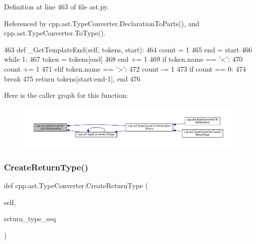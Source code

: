 Definition at line 463 of file ast.\+py.



Referenced by cpp.\+ast.\+Type\+Converter.\+Declaration\+To\+Parts(), and cpp.\+ast.\+Type\+Converter.\+To\+Type().


\begin{DoxyCode}
463     \textcolor{keyword}{def }\_GetTemplateEnd(self, tokens, start):
464         count = 1
465         end = start
466         \textcolor{keywordflow}{while} 1:
467             token = tokens[end]
468             end += 1
469             \textcolor{keywordflow}{if} token.name == \textcolor{stringliteral}{'<'}:
470                 count += 1
471             \textcolor{keywordflow}{elif} token.name == \textcolor{stringliteral}{'>'}:
472                 count -= 1
473                 \textcolor{keywordflow}{if} count == 0:
474                     \textcolor{keywordflow}{break}
475         \textcolor{keywordflow}{return} tokens[start:end-1], end
476 
\end{DoxyCode}
Here is the caller graph for this function\+:
\nopagebreak
\begin{figure}[H]
\begin{center}
\leavevmode
\includegraphics[width=350pt]{classcpp_1_1ast_1_1TypeConverter_adcf38788abb48f32f4a63eb091b3d53a_icgraph}
\end{center}
\end{figure}
\mbox{\label{classcpp_1_1ast_1_1TypeConverter_a7e4d429131d9d5742ec44c78b61beb87}} 
\subsubsection{\texorpdfstring{Create\+Return\+Type()}{CreateReturnType()}}
{\footnotesize\ttfamily def cpp.\+ast.\+Type\+Converter.\+Create\+Return\+Type (\begin{DoxyParamCaption}\item[{}]{self,  }\item[{}]{return\+\_\+type\+\_\+seq }\end{DoxyParamCaption})}



